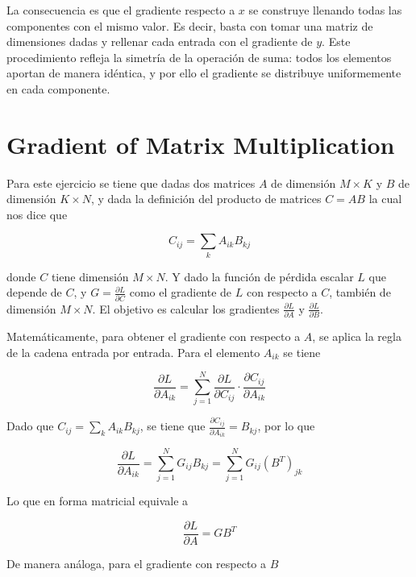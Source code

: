 \documentclass[12pt, letterpaper]{article}
\begin{document}
La consecuencia es que el gradiente respecto a \(x\) se construye llenando todas las componentes con el mismo valor. 
Es decir, basta con tomar una matriz de dimensiones dadas y rellenar cada entrada con el gradiente de \(y\). 
Este procedimiento refleja la simetría de la operación de suma: todos los elementos aportan de manera idéntica, 
y por ello el gradiente se distribuye uniformemente en cada componente.


\newpage

\section{Gradient of Matrix Multiplication}

Para este ejercicio se tiene que dadas dos matrices \(A\) de dimensión \(M \times K\) y \(B\) de dimensión \(K \times N\), y dada la definición del producto de matrices \(C = AB\) la cual nos dice que 

\[
C_{ij} = \sum_{k} A_{ik} B_{kj}
\]

donde \(C\) tiene dimensión \(M \times N\). Y dado la función de pérdida escalar \(L\) que depende de \(C\), y \(G = \frac{\partial L}{\partial C}\) como el gradiente de \(L\) con respecto a \(C\), también de dimensión \(M \times N\). El objetivo es calcular los gradientes \(\frac{\partial L}{\partial A}\) y \(\frac{\partial L}{\partial B}\).

Matemáticamente, para obtener el gradiente con respecto a \(A\), se aplica la regla de la cadena entrada por entrada. Para el elemento \(A_{ik}\) se tiene 

\[
\frac{\partial L}{\partial A_{ik}} = \sum_{j=1}^{N} \frac{\partial L}{\partial C_{ij}} 
\cdot \frac{\partial C_{ij}}{\partial A_{ik}}
\]



Dado que \(C_{ij} = \sum_{k} A_{ik} B_{kj}\), se tiene que 
\(\frac{\partial C_{ij}}{\partial A_{ik}} = B_{kj}\), por lo que



\[
\frac{\partial L}{\partial A_{ik}} = \sum_{j=1}^{N} G_{ij} B_{kj} = 
\sum_{j=1}^{N} G_{ij} (B^T)_{jk}
\]



Lo que en forma matricial equivale a



\[
\frac{\partial L}{\partial A} = G B^T
\]



De manera análoga, para el gradiente con respecto a \(B\)
\end{document}
